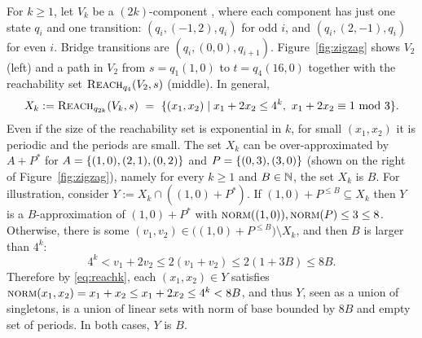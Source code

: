 \begin{example}
For $k\geq 1$, let $V_k$ be a $(2k)$-component \dvass, where each component has just one state $q_i$
and one transition:
$(q_i, (-1,2), q_i)$ for odd $i$, and $(q_i, (2,-1), q_i)$ for even $i$.
Bridge transitions are $(q_i, (0,0), q_{i+1})$.
Figure~\ref{fig:zigzag} shows $V_2$ (left) and 
a path in $V_2$ from $s = q_1(1,0)$ to $t = q_4(16,0)$ together with 
the reachability set $\textsc{Reach}_{q_4}(V_2, s)$ (middle).
In general,
\begin{align} \label{eq:reachk}
X_k := \textsc{Reach}_{q_{2k}}(V_k, s) \ = \ \{(x_1,x_2) \mid x_1+2x_2 \leq 4^k, \  x_1+2x_2 \equiv 1 \!\! \mod 3\}.
\end{align}
Even if the size of the reachability set is 
exponential in $k$, for small $(x_1, x_2)$ it is periodic and the periods are small.
The set $X_k$ can be over-approximated by $A + P^*$ for $A = \{(1,0),(2,1),(0,2)\}$ and $P = \{(0,3),(3,0)\}$
(shown on the right of Figure~\ref{fig:zigzag}), namely for every $k\geq 1$ and $B\in\mathbb{N}$,
the set $X_k$ is  {$B$}. 
For illustration, consider $Y := X_k \cap ((1,0) + P^*)$.
If $(1,0) + P^{\leq B} \subseteq X_k$ then $Y$ is a $B$-approximation
of $(1,0) + P^*$ with $\textsc{norm}((1,0)), \textsc{norm}(P) \leq 3 \leq 8$. 
Otherwise, there is some $(v_1, v_2) \in \big((1,0) + P^{\leq B}\big)\setminus X_k$, and
then $B$ is larger than $4^k$:
\[
4^k < v_1 + 2 v_2 \leq 2(v_1 + v_2) \leq 2(1+3B) \leq 8B.
\]
Therefore by \eqref{eq:reachk}, each $(x_1,x_2) \in Y$ satisfies 
$\textsc{norm}(x_1,x_2) = x_1 + x_2 \leq x_1 + 2x_2 \leq 4^k < 8B$, and thus
$Y$, seen as a union of singletons, is a union of 
linear sets with norm of base bounded by $8B$ and empty set of periods. 
In both cases, 
$Y$ is  {$B$}. 
\end{example}